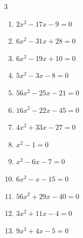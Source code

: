 \begin{multicols}{3}
\begin{enumerate}
  \item $2x^{2}-17x-9=0$


  \item $6x^{2}-31x+28=0$


  \item $6x^{2}-19x+10=0$


  \item $5x^{2}-3x-8=0$


  \item $56x^{2}-25x-21=0$


  \item $16x^{2}-22x-45=0$


  \item $4x^{2}+33x-27=0$


  \item $x^{2}-1=0$

        \phantom{$\displaystyle x=1,\; -1$}

  \item $x^{2}-6x-7=0$

        \phantom{$\displaystyle x=-1,\; 7$}

\columnbreak %

  \item $6x^{2}-x-15=0$


  \item $56x^{2}+29x-40=0$


  \item $3x^{2}+11x-4=0$


  \item $9x^{2}+4x-5=0$


\end{enumerate}
\end{multicols}

